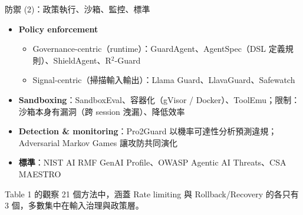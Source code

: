 \documentclass[aspectratio=169]{beamer}
\begin{document}
\begin{frame}{防禦 (2)：政策執行、沙箱、監控、標準}
    \footnotesize
    \begin{itemize}
        \item \textbf{Policy enforcement}
        \begin{itemize}
            \item Governance-centric（runtime）：GuardAgent、AgentSpec（DSL 定義規則）、ShieldAgent、R$^2$-Guard
            \item Signal-centric（掃描輸入輸出）：Llama Guard、LlavaGuard、Safewatch
        \end{itemize}
        \item \textbf{Sandboxing}：SandboxEval、容器化（gVisor / Docker）、ToolEmu；限制：沙箱本身有漏洞（跨 session 洩漏）、降低效率
        \item \textbf{Detection \& monitoring}：Pro2Guard 以機率可達性分析預測違規；Adversarial Markov Games 讓攻防共同演化
        \item \textbf{標準}：NIST AI RMF GenAI Profile、OWASP Agentic AI Threats、CSA MAESTRO
    \end{itemize}

    \begin{alertblock}{Table 1 的觀察}
        21 個方法中，涵蓋 Rate limiting 與 Rollback/Recovery 的各只有 3 個，多數集中在輸入治理與政策層。
    \end{alertblock}
\end{frame}
\end{document}

